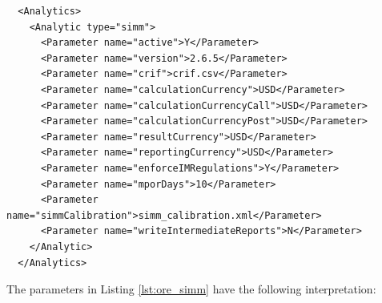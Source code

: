 \begin{listing}[H]
\begin{verbatim}
  <Analytics>
    <Analytic type="simm">
      <Parameter name="active">Y</Parameter>
      <Parameter name="version">2.6.5</Parameter>
      <Parameter name="crif">crif.csv</Parameter>
      <Parameter name="calculationCurrency">USD</Parameter>
      <Parameter name="calculationCurrencyCall">USD</Parameter>
      <Parameter name="calculationCurrencyPost">USD</Parameter>
      <Parameter name="resultCurrency">USD</Parameter>
      <Parameter name="reportingCurrency">USD</Parameter>
      <Parameter name="enforceIMRegulations">Y</Parameter>
      <Parameter name="mporDays">10</Parameter>
      <Parameter name="simmCalibration">simm_calibration.xml</Parameter>
      <Parameter name="writeIntermediateReports">N</Parameter>
    </Analytic>
  </Analytics>
\end{verbatim}
\caption{ORE analytic: ISDA SIMM}
\label{lst:ore_simm}
\end{listing}

The parameters in Listing \ref{lst:ore_simm} have the following interpretation:

